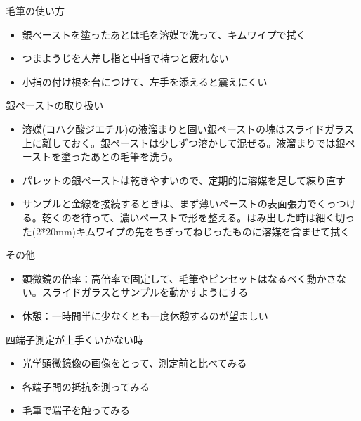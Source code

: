 毛筆の使い方
\begin{itemize}
\item 銀ペーストを塗ったあとは毛を溶媒で洗って、キムワイプで拭く
\item つまようじを人差し指と中指で持つと疲れない
\item 小指の付け根を台につけて、左手を添えると震えにくい
\end{itemize}

銀ペーストの取り扱い
\begin{itemize}
\item 溶媒(コハク酸ジエチル)の液溜まりと固い銀ペーストの塊はスライドガラス上に離しておく。銀ペーストは少しずつ溶かして混ぜる。液溜まりでは銀ペーストを塗ったあとの毛筆を洗う。
\item パレットの銀ペーストは乾きやすいので、定期的に溶媒を足して練り直す
\item サンプルと金線を接続するときは、まず薄いペーストの表面張力でくっつける。乾くのを待って、濃いペーストで形を整える。はみ出した時は細く切った(2*20mm)キムワイプの先をちぎってねじったものに溶媒を含ませて拭く
\end{itemize}

その他
\begin{itemize}
\item 顕微鏡の倍率：高倍率で固定して、毛筆やピンセットはなるべく動かさない。スライドガラスとサンプルを動かすようにする
\item 休憩：一時間半に少なくとも一度休憩するのが望ましい
\end{itemize}

四端子測定が上手くいかない時
\begin{itemize}
\item 光学顕微鏡像の画像をとって、測定前と比べてみる
\item 各端子間の抵抗を測ってみる
\item 毛筆で端子を触ってみる
\end{itemize}

\newpage
